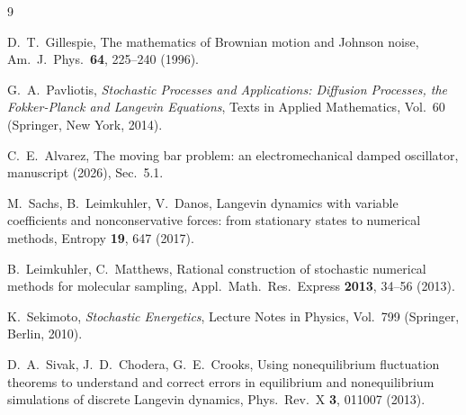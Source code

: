 \documentclass[11pt]{article}
\begin{document}

\begin{thebibliography}{9}

D.~T.~Gillespie, The mathematics of Brownian motion and Johnson noise, Am.\ J.\ Phys.\ {\bf 64}, 225--240 (1996).

G.~A.~Pavliotis, {\it Stochastic Processes and Applications: Diffusion Processes, the Fokker-Planck and Langevin Equations}, Texts in Applied Mathematics, Vol.~60 (Springer, New York, 2014).

C.~E.~Alvarez, The moving bar problem: an electromechanical damped oscillator, manuscript (2026), Sec.~5.1.

M.~Sachs, B.~Leimkuhler, V.~Danos, Langevin dynamics with variable coefficients and nonconservative forces: from stationary states to numerical methods, Entropy {\bf 19}, 647 (2017).

B.~Leimkuhler, C.~Matthews, Rational construction of stochastic numerical methods for molecular sampling, Appl.\ Math.\ Res.\ Express {\bf 2013}, 34--56 (2013).

K.~Sekimoto, {\it Stochastic Energetics}, Lecture Notes in Physics, Vol.~799 (Springer, Berlin, 2010).

D.~A.~Sivak, J.~D.~Chodera, G.~E.~Crooks, Using nonequilibrium fluctuation theorems to understand and correct errors in equilibrium and nonequilibrium simulations of discrete Langevin dynamics, Phys.\ Rev.\ X {\bf 3}, 011007 (2013).

\end{thebibliography}
\end{document}
